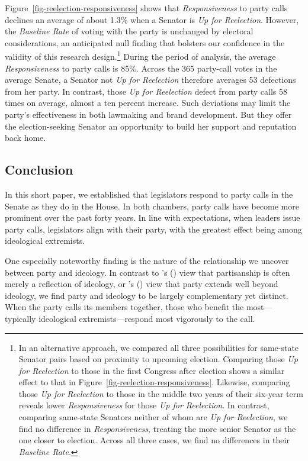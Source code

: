 \documentclass[12pt]{article}
\def\citeapos#1{\citeauthor{#1}'s (\citeyear{#1})} %
\begin{document}
Figure~\ref{fig-reelection-responsiveness} shows that \textit{Responsiveness} to party calls declines an average of about 1.3\% when a Senator is \textit{Up for Reelection}.  However, the \textit{Baseline Rate} of voting with the party is unchanged by electoral considerations,
an anticipated null finding that bolsters our confidence in the validity of this research design.\footnote{\doublespacing\normalsize  In an alternative approach, we compared all three possibilities for same-state Senator pairs based on proximity to upcoming election.  Comparing those \textit{Up for Reelection} to those in the first Congress after election shows a similar effect to that in Figure~\ref{fig-reelection-responsiveness}.  Likewise, comparing those \textit{Up for Reelection} to those in the middle two years of their six-year term reveals lower \textit{Responsiveness} for those \textit{Up for Reelection}.  In contrast, comparing same-state Senators neither of whom are \textit{Up for Reelection}, we find no difference in \textit{Responsiveness}, treating the more senior Senator as the one closer to election.  Across all three cases, we find no differences in their \textit{Baseline Rate}.}
During the period of analysis, the average \textit{Responsiveness} to party calls is 85\%. Across the 365 party-call votes in the average Senate, a Senator not \textit{Up for Reelection} therefore averages 53 defections from her party.  In contrast, those \textit{Up for Reelection} defect from party calls 58 times on average, almost a ten percent increase.  Such deviations may limit the party's effectiveness in both lawmaking and brand development.  But they offer the election-seeking Senator an opportunity to build her support and reputation back home.

\subsection*{Conclusion}

In this short paper, we established that legislators respond to party calls in the Senate as they do in the House. In both chambers, party calls have become more prominent over the past forty years.  In line with expectations, when leaders issue party calls, legislators align with their party, with the greatest effect being among ideological extremists.

One especially noteworthy finding is the nature of the relationship we uncover between party and ideology.  In contrast to \citeapos{Krehbiel:1993} view that partisanship is often merely a reflection of ideology, or \citeapos{Lee:2009} view that party extends well beyond ideology, we find party and ideology to be largely complementary yet distinct.  When the party calls its members together, those who benefit the most---typically ideological extremists---respond most vigorously to the call.
\end{document}
